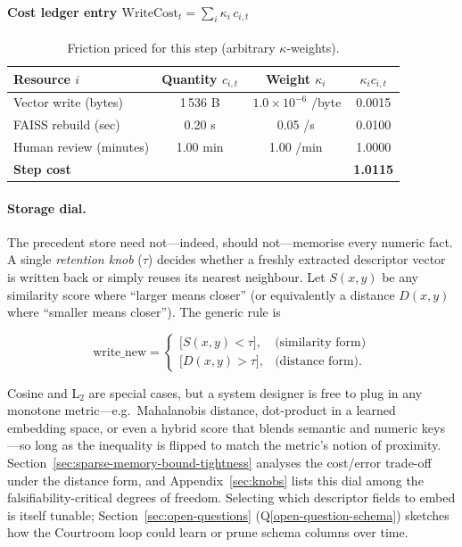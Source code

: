 \documentclass[11pt]{article}
\begin{document}
\paragraph{Cost ledger entry $\displaystyle\text{WriteCost}_t=\sum_i\kappa_i\,c_{i,t}$}

\begin{table}[h]
\centering\footnotesize
\begin{tabular}{@{}lccc@{}}
\toprule
Resource $i$ & Quantity $c_{i,t}$ & Weight $\kappa_i$ & $\kappa_i c_{i,t}$ \\ \midrule
Vector write (bytes)      & 1\,536 B & \,$1.0\times10^{-6}$ /byte & 0.0015 \\
FAISS rebuild (sec)       & 0.20 s   & 0.05 /s                 & 0.0100 \\
Human review (minutes)    & 1.00 min & 1.00 /min               & 1.0000 \\ \midrule
\textbf{Step cost}  & & &  \textbf{1.0115} \\ \bottomrule
\end{tabular}
\caption{Friction priced for this step (arbitrary $\kappa$-weights).}
\end{table}

\paragraph{Storage dial.}
The precedent store need not—indeed, should not—memorise every numeric
fact. A single \emph{retention knob} (\(\tau\)) decides whether a freshly
extracted descriptor vector is written back or simply reuses its nearest
neighbour. Let \(S(x,y)\) be any similarity score where “larger means
closer” (or equivalently a distance \(D(x,y)\) where “smaller means
closer”). The generic rule is

\[
\text{write\_new} =
\begin{cases}
\bigl[S(x,y) < \tau\bigr], & \text{(similarity form)}\\[4pt]
\bigl[D(x,y) > \tau\bigr], & \text{(distance form)}.
\end{cases}
\]

Cosine and L$_2$ are special cases, but a system designer is free to
plug in any monotone metric—e.g.\ Mahalanobis distance, dot-product in a
learned embedding space, or even a hybrid score that blends semantic and
numeric keys—so long as the inequality is flipped to match the
metric's notion of proximity. Section~\ref{sec:sparse-memory-bound-tightness} analyses the cost/error trade-off
under the distance form, and Appendix~\ref{sec:knobs} lists this dial
among the falsifiability-critical degrees of freedom. Selecting which descriptor 
fields to embed is itself tunable; Section~\ref{sec:open-questions} (Q\ref{open-question-schema}) sketches how the Courtroom loop 
could learn or prune schema columns over time.
\end{document}
